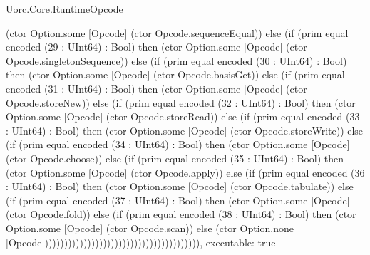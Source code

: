 \begin{lexlean}{Uorc.Core.RuntimeOpcode}
\begin{semanticmodule}
{(ctor Option.some [Opcode] (ctor Opcode.sequenceEqual)) else (if (prim equal encoded (29 : UInt64) : Bool) then (ctor Option.some [Opcode] (ctor Opcode.singletonSequence)) else (if (prim equal encoded (30 : UInt64) : Bool) then (ctor Option.some [Opcode] (ctor Opcode.basisGet)) else (if (prim equal encoded (31 : UInt64) : Bool) then (ctor Option.some [Opcode] (ctor Opcode.storeNew)) else (if (prim equal encoded (32 : UInt64) : Bool) then (ctor Option.some [Opcode] (ctor Opcode.storeRead)) else (if (prim equal encoded (33 : UInt64) : Bool) then (ctor Option.some [Opcode] (ctor Opcode.storeWrite)) else (if (prim equal encoded (34 : UInt64) : Bool) then (ctor Option.some [Opcode] (ctor Opcode.choose)) else (if (prim equal encoded (35 : UInt64) : Bool) then (ctor Option.some [Opcode] (ctor Opcode.apply)) else (if (prim equal encoded (36 : UInt64) : Bool) then (ctor Option.some [Opcode] (ctor Opcode.tabulate)) else (if (prim equal encoded (37 : UInt64) : Bool) then (ctor Option.some [Opcode] (ctor Opcode.fold)) else (if (prim equal encoded (38 : UInt64) : Bool) then (ctor Option.some [Opcode] (ctor Opcode.scan)) else (ctor Option.none [Opcode])))))))))))))))))))))))))))))))))))))))),
  executable: true
}


\end{semanticmodule}
\end{lexlean}
